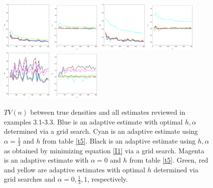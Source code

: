 \documentclass[
twoside,
openright,
titlepage,
numbers=noenddot,
headinclude,%
footinclude=true,
dottedtoc, %
ngerman,
american, %
pagesize=pdftex,
]{book}
\begin{document}
\begin{example}
\begin{figure}[H]
			\includegraphics[width=0.22\textwidth]{figures/2DTVexamples/allsn1}
			\includegraphics[width=0.22\textwidth]{figures/2DTVexamples/allsn2}
			\includegraphics[width=0.22\textwidth]{figures/2DTVexamples/alln+l1}
			\includegraphics[width=0.22\textwidth]{figures/2DTVexamples/alln+l2}
			\includegraphics[width=0.22\textwidth]{figures/2DTVexamples/allsn+t1}
			\includegraphics[width=0.22\textwidth]{figures/2DTVexamples/allsn+t2}
			\caption{$TV(n)$ between true densities and all estimates reviewed in examples 3.1-3.3. Blue is an adaptive estimate with optimal $h,\alpha$ determined via a grid search. Cyan is an adaptive estimate using $\alpha=\frac{1}{3}$ and $h$ from table \ref{t5}. Black is an adaptive estimate using $h,\alpha$ as obtained by minimizing equation \eqref{I1} via a grid search. Magenta is an adaptive estimate with $\alpha=0$ and $h$ from table \ref{t5}. Green, red and yellow are adaptive estimates with optimal $h$ determined via grid searches and $\alpha=0,\frac{1}{3},1$, respectively.}
			\label{fig:e72}
		\end{figure}
	\end{example}
\end{document}
